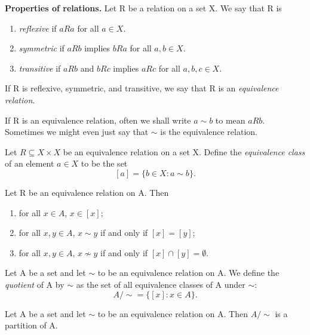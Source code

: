 \documentclass{tufte-handout}
\begin{document}
\textbf{Properties of relations.} Let R be a relation on a set X. We say that R is
\begin{enumerate}
    \item \textit{reflexive} if \( aRa \) for all \( a \in X \).
    \item \textit{symmetric} if \( aRb \) implies \( bRa \) for all \( a,b \in X \).
    \item \textit{transitive} if \( aRb \) and \( bRc \) implies \( aRc \) for all \( a,b,c \in X \).
\end{enumerate}

\begin{Definition}
    If R is reflexive, symmetric, and transitive, we say that R is an \textit{equivalence relation}.
\end{Definition}
If R is an equivalence relation, often we shall write \( a \sim b \) to mean \( aRb \).
Sometimes we might even just say that \( \sim \) is the equivalence relation.
\begin{Definition}
    Let \(R \subseteq X \times X \) be an equivalence relation on a set X. Define the \textit{equivalence class} of an element \( a \in X \) to
    be the set
    \[ [a] = \{b \in X: a\sim b\}. \]
\end{Definition}

\begin{Proposition}
    Let R be an equivalence relation on A. Then
    \begin{enumerate}
        \item for all \( x \in A \), \( x \in [x] \);
        \item for all \( x,y \in A \), \( x\sim y \) if and only if \( [x] = [y] \);
        \item for all \( x,y \in A \), \( x \not\sim y \) if and only if \( [x] \cap [y] = \emptyset \).
    \end{enumerate}
\end{Proposition}

\begin{Definition}
    Let A be a set and let \( \sim \) to be an equivalence relation on A.
    We define the \textit{quotient} of A by \( \sim \) as the set of all equivalence classes of A under \( \sim \):
    \[ A\slash \sim = \{[x]: x \in A\}. \]
\end{Definition}

\begin{Proposition}
    Let A be a set and let \( \sim \) to be an equivalence relation on A. 
    Then \(A\slash \sim\) is a partition of A.
\end{Proposition}
\end{document}
